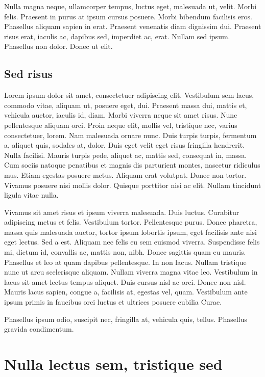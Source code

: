 \documentclass[../hdr.tex]{subfiles}
\begin{document}
Nulla magna neque, ullamcorper tempus, luctus eget, malesuada ut, velit. Morbi
felis. Praesent in purus at ipsum cursus posuere. Morbi bibendum facilisis eros.
Phasellus aliquam sapien in erat. Praesent venenatis diam dignissim dui.
Praesent risus erat, iaculis ac, dapibus sed, imperdiet ac, erat. Nullam sed
ipsum. Phasellus non dolor. Donec ut elit.

\subsection{Sed risus}

Lorem ipsum dolor sit amet, consectetuer adipiscing elit. Vestibulum sem lacus,
commodo vitae, aliquam ut, posuere eget, dui. Praesent massa dui, mattis et,
vehicula auctor, iaculis id, diam. Morbi viverra neque sit amet risus. Nunc
pellentesque aliquam orci. Proin neque elit, mollis vel, tristique nec, varius
consectetuer, lorem. Nam malesuada ornare nunc. Duis turpis turpis, fermentum a,
aliquet quis, sodales at, dolor. Duis eget velit eget risus fringilla hendrerit.
Nulla facilisi. Mauris turpis pede, aliquet ac, mattis sed, consequat in, massa.
Cum sociis natoque penatibus et magnis dis parturient montes, nascetur ridiculus
mus. Etiam egestas posuere metus. Aliquam erat volutpat. Donec non tortor.
Vivamus posuere nisi mollis dolor. Quisque porttitor nisi ac elit. Nullam
tincidunt ligula vitae nulla.

Vivamus sit amet risus et ipsum viverra malesuada. Duis luctus. Curabitur
adipiscing metus et felis. Vestibulum tortor. Pellentesque purus. Donec
pharetra, massa quis malesuada auctor, tortor ipsum lobortis ipsum, eget
facilisis ante nisi eget lectus. Sed a est. Aliquam nec felis eu sem euismod
viverra. Suspendisse felis mi, dictum id, convallis ac, mattis non, nibh. Donec
sagittis quam eu mauris. Phasellus et leo at quam dapibus pellentesque. In non
lacus. Nullam tristique nunc ut arcu scelerisque aliquam. Nullam viverra magna
vitae leo. Vestibulum in lacus sit amet lectus tempus aliquet. Duis cursus nisl
ac orci. Donec non nisl. Mauris lacus sapien, congue a, facilisis at, egestas
vel, quam. Vestibulum ante ipsum primis in faucibus orci luctus et ultrices
posuere cubilia Curae.

Phasellus ipsum odio, suscipit nec, fringilla at, vehicula quis, tellus.
Phasellus gravida condimentum.

\section{Nulla lectus sem, tristique sed}
\end{document}
